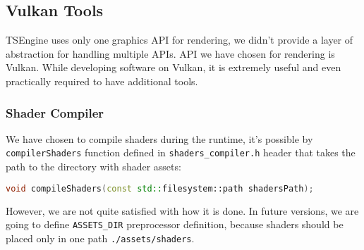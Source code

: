 \newpage
\subsection{Vulkan Tools}
\hspace{\parindent}
TSEngine uses only one graphics API for rendering, we didn't provide a layer of abstraction for handling multiple APIs. API we have chosen for rendering is Vulkan. While developing software on Vulkan, it is extremely useful and even practically required to have additional tools.
\subsubsection{Shader Compiler}
\label{sec:shader_compiler}
\hspace{\parindent}
We have chosen to compile shaders during the runtime, it's possible by \texttt{compilerShaders} function defined in \texttt{shaders\_compiler.h} header that takes the path to the directory with shader assets: 
\begin{lstlisting}[language=c++, caption=Shaders Compiler header (./engine/src/vulkan\_tools/shaders\_compiler.h)]
void compileShaders(const std::filesystem::path shadersPath);
\end{lstlisting}

However, we are not quite satisfied with how it is done. In future versions, we are going to define \texttt{ASSETS\_DIR} preprocessor definition, because shaders should be placed only in one path \texttt{./assets/shaders}.

